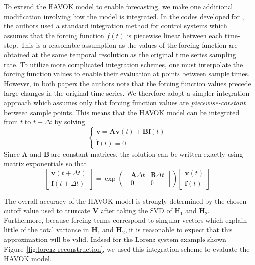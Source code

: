 To extend the HAVOK model to enable forecasting, we make one additional
modification involving how the model is integrated. In the codes developed for
\cite{brunton-havok-orig, havok-diffgeo}, the authors used a standard
integration method for control systems which assumes that the forcing
function $f(t)$ is piecewise linear between each time-step. This is a reasonable
assumption as the values of the forcing function are obtained at the same
temporal resolution as the original time series sampling rate. To utilize more
complicated integration schemes, one must interpolate the forcing function
values to enable their evaluation at points between sample times. However, in
both papers the authors note that the forcing function values precede large
changes in the original time series. We therefore adopt a simpler integration
approach which assumes only that forcing function values are
\textit{piecewise-constant} between sample points. This means that the HAVOK
model can be integrated from $t$ to $t+\Delta t$ by solving
\begin{equation}
  \begin{cases}
    \dot{\mathbf{v}} = \mathbf{A}\mathbf{v}(t) + \mathbf{B}\mathbf{f}(t) \\
    \dot{\mathbf{f}}(t) = 0
  \end{cases}
\end{equation}
Since $\mathbf{A}$ and $\mathbf{B}$ are constant matrices, the solution can be
written exactly using matrix exponentials so that
\begin{equation}
  \begin{bmatrix} \mathbf{v}(t+\Delta t) \\ \mathbf{f}(t+\Delta t) \end{bmatrix} = \exp \left(  \begin{bmatrix}
    \mathbf{A}\Delta t & \mathbf{B} \Delta t \\
    0 & 0
  \end{bmatrix} \right) \begin{bmatrix} \mathbf{v}(t) \\ \mathbf{f}(t) \end{bmatrix}
\end{equation}

The overall accuracy of the HAVOK model is strongly determined by the chosen
cutoff value used to truncate $\mathbf{V}$ after taking the SVD of
$\mathbf{H}_1$ and $\mathbf{H}_2$. Furthermore, because forcing terms correspond
to singular vectors which explain little of the total variance in $\mathbf{H}_1$
and $\mathbf{H}_2$, it is reasonable to expect that this approximation will be
valid. Indeed for the Lorenz system example shown
Figure~\ref{fig:lorenz-reconstruction}, we used this integration scheme to
evaluate the HAVOK model.

